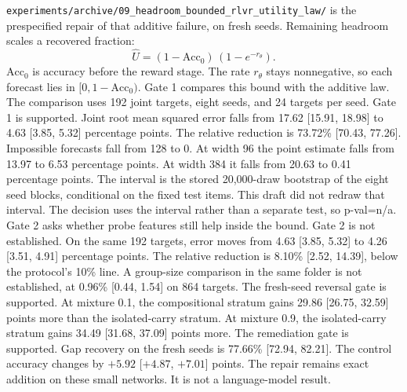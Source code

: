 \texttt{experiments/archive/09\_headroom\_bounded\_rlvr\_utility\_law/} is the prespecified repair of that additive failure, on fresh seeds.
Remaining headroom scales a recovered fraction:
\begin{equation}
\label{eq:headroom}
\widehat{U}=(1-\mathrm{Acc}_0)\,(1-e^{-r_\theta}).
\end{equation}
$\mathrm{Acc}_0$ is accuracy before the reward stage.
The rate $r_\theta$ stays nonnegative, so each forecast lies in $[0, 1-\mathrm{Acc}_0)$.
Gate 1 compares this bound with the additive law.
The comparison uses 192 joint targets, eight seeds, and 24 targets per seed.
Gate 1 is supported.
Joint root mean squared error falls from 17.62 [15.91, 18.98] to 4.63 [3.85, 5.32] percentage points.
The relative reduction is 73.72\% [70.43, 77.26].
Impossible forecasts fall from 128 to 0.
At width 96 the point estimate falls from 13.97 to 6.53 percentage points.
At width 384 it falls from 20.63 to 0.41 percentage points.
The interval is the stored 20{,}000-draw bootstrap of the eight seed blocks, conditional on the fixed test items.
This draft did not redraw that interval.
The decision uses the interval rather than a separate test, so p-val=n/a.
Gate 2 asks whether probe features still help inside the bound.
Gate 2 is not established.
On the same 192 targets, error moves from 4.63 [3.85, 5.32] to 4.26 [3.51, 4.91] percentage points.
The relative reduction is 8.10\% [2.52, 14.39], below the protocol's 10\% line.
A group-size comparison in the same folder is not established, at 0.96\% [0.44, 1.54] on 864 targets.
The fresh-seed reversal gate is supported.
At mixture 0.1, the compositional stratum gains 29.86 [26.75, 32.59] points more than the isolated-carry stratum.
At mixture 0.9, the isolated-carry stratum gains 34.49 [31.68, 37.09] points more.
The remediation gate is supported.
Gap recovery on the fresh seeds is 77.66\% [72.94, 82.21].
The control accuracy changes by $+5.92$ [$+4.87$, $+7.01$] points.
The repair remains exact addition on these small networks.
It is not a language-model result.
